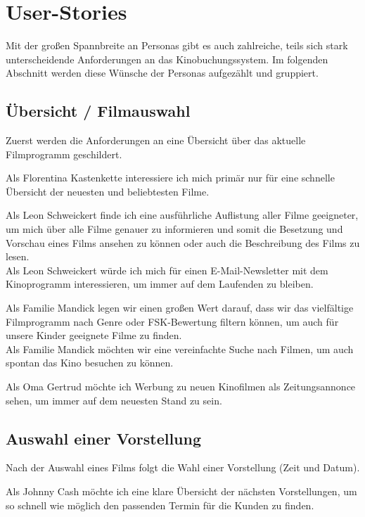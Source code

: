 \section{User-Stories}
\multipleauthorsection{\authorGP}{\authorRF, \authorEJ}

Mit der großen Spannbreite an Personas gibt es auch zahlreiche, teils sich stark unterscheidende Anforderungen an das Kinobuchungssystem.
Im folgenden Abschnitt werden diese Wünsche der Personas aufgezählt und gruppiert.

\subsection{Übersicht / Filmauswahl}
Zuerst werden die Anforderungen an eine Übersicht über das aktuelle Filmprogramm geschildert.

Als Florentina Kastenkette interessiere ich mich primär nur für eine schnelle Übersicht der neuesten und beliebtesten Filme.

Als Leon Schweickert finde ich eine ausführliche Auflistung aller Filme geeigneter, um mich über alle Filme genauer zu informieren und somit die Besetzung und Vorschau eines Films ansehen zu können oder auch die Beschreibung des Films zu lesen.
\\
Als Leon Schweickert würde ich mich für einen E-Mail-Newsletter mit dem Kinoprogramm interessieren, um immer auf dem Laufenden zu bleiben.

Als Familie Mandick legen wir einen großen Wert darauf, dass wir das vielfältige Filmprogramm nach Genre oder \acs{FSK}-Bewertung filtern können, um auch für unsere Kinder geeignete Filme zu finden.
\\
Als Familie Mandick möchten wir eine vereinfachte Suche nach Filmen, um auch spontan das Kino besuchen zu können.

Als Oma Gertrud möchte ich Werbung zu neuen Kinofilmen als Zeitungsan\-non\-ce sehen, um immer auf dem neuesten Stand zu sein.

\subsection{Auswahl einer Vorstellung}
Nach der Auswahl eines Films folgt die Wahl einer Vorstellung (Zeit und Datum).

Als Johnny Cash möchte ich eine klare Übersicht der nächsten Vorstellungen, um so schnell wie möglich den passenden Termin für die Kunden zu finden.

